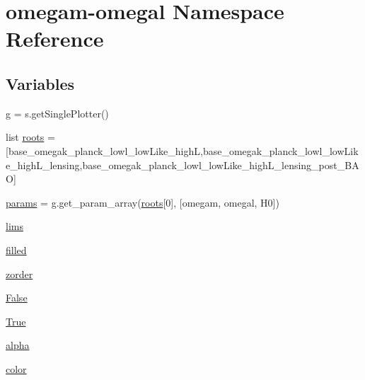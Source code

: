 \hypertarget{namespaceomegam-omegal}{}\section{omegam-\/omegal Namespace Reference}
\label{namespaceomegam-omegal}
\subsection*{Variables}
\begin{DoxyCompactItemize}
\item 
\mbox{\hyperlink{namespaceomegam-omegal_a4054f790069e2d1ffd50aeb2578d3fcc}{g}} = s.\+get\+Single\+Plotter()
\item 
list \mbox{\hyperlink{namespaceomegam-omegal_a4c44907be0efd6e53ade38200d4441eb}{roots}} = \mbox{[}\textquotesingle{}base\+\_\+omegak\+\_\+planck\+\_\+lowl\+\_\+low\+Like\+\_\+highL\textquotesingle{},\textquotesingle{}base\+\_\+omegak\+\_\+planck\+\_\+lowl\+\_\+low\+Like\+\_\+high\+L\+\_\+lensing\textquotesingle{},\textquotesingle{}base\+\_\+omegak\+\_\+planck\+\_\+lowl\+\_\+low\+Like\+\_\+high\+L\+\_\+lensing\+\_\+post\+\_\+\+B\+AO\textquotesingle{}\mbox{]}
\item 
\mbox{\hyperlink{namespaceomegam-omegal_ab7ba8589a0821c23569cc7a92c334bb3}{params}} = g.\+get\+\_\+param\+\_\+array(\mbox{\hyperlink{namespaceomegam-omegal_a4c44907be0efd6e53ade38200d4441eb}{roots}}\mbox{[}0\mbox{]}, \mbox{[}\textquotesingle{}omegam\textquotesingle{}, \textquotesingle{}omegal\textquotesingle{}, \textquotesingle{}H0\textquotesingle{}\mbox{]})
\item 
\mbox{\hyperlink{namespaceomegam-omegal_a95c2fb2d34f5ca5534b06c1360103b1e}{lims}}
\item 
\mbox{\hyperlink{namespaceomegam-omegal_a05373ed528194190a2a89b16b7cb1a3a}{filled}}
\item 
\mbox{\hyperlink{namespaceomegam-omegal_a16851c3c3b788cabc69f3da394ecd0e8}{zorder}}
\item 
\mbox{\hyperlink{namespaceomegam-omegal_a14f631ac642d366aa5e0d65d1e670c45}{False}}
\item 
\mbox{\hyperlink{namespaceomegam-omegal_acd24ecc78d0dddacbed664144f09801d}{True}}
\item 
\mbox{\hyperlink{namespaceomegam-omegal_a7638a38c1eb72d59a359961b305889d8}{alpha}}
\item 
\mbox{\hyperlink{namespaceomegam-omegal_aa3a9b83fa0910350b67b8bedcc7d2aec}{color}}
\end{DoxyCompactItemize}


